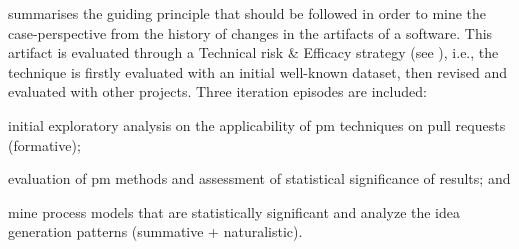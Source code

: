  summarises the guiding principle that should be followed in order to mine the case-perspective from the history of changes in the artifacts of a software. This artifact is evaluated through a Technical risk \& Efficacy strategy (see \cite{Venable2016}), i.e., the technique is firstly evaluated with an initial well-known dataset, then revised and evaluated with other projects. Three iteration episodes are included: 
\begin{iiilist}
	\item initial exploratory analysis on the applicability of \gls{pm} techniques on pull requests (formative);
	\item evaluation of \gls{pm} methods and assessment of statistical significance of results; and
	\item mine process models that are statistically significant and analyze the idea generation patterns (summative + naturalistic).
\end{iiilist}






